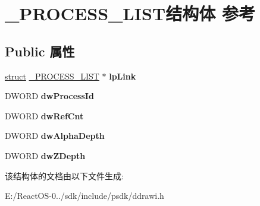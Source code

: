 \hypertarget{struct___p_r_o_c_e_s_s___l_i_s_t}{}\section{\+\_\+\+P\+R\+O\+C\+E\+S\+S\+\_\+\+L\+I\+S\+T结构体 参考}
\label{struct___p_r_o_c_e_s_s___l_i_s_t}
\subsection*{Public 属性}
\begin{DoxyCompactItemize}
\item 
\mbox{\label{struct___p_r_o_c_e_s_s___l_i_s_t_a6c4ec2fee887d7492450e69efdd9f377}} 
\hyperlink{interfacestruct}{struct} \hyperlink{struct___p_r_o_c_e_s_s___l_i_s_t}{\+\_\+\+P\+R\+O\+C\+E\+S\+S\+\_\+\+L\+I\+ST} $\ast$ {\bfseries lp\+Link}
\item 
\mbox{\label{struct___p_r_o_c_e_s_s___l_i_s_t_af2ec9f91093679a735a80cef92e9316e}} 
D\+W\+O\+RD {\bfseries dw\+Process\+Id}
\item 
\mbox{\label{struct___p_r_o_c_e_s_s___l_i_s_t_a080008bd49300be8aadc88dc947351ab}} 
D\+W\+O\+RD {\bfseries dw\+Ref\+Cnt}
\item 
\mbox{\label{struct___p_r_o_c_e_s_s___l_i_s_t_a99b6d5dc0f9b7eb00f559cdf457d47a6}} 
D\+W\+O\+RD {\bfseries dw\+Alpha\+Depth}
\item 
\mbox{\label{struct___p_r_o_c_e_s_s___l_i_s_t_a3c04aac540f68dc2fddb7816e08e3aec}} 
D\+W\+O\+RD {\bfseries dw\+Z\+Depth}
\end{DoxyCompactItemize}


该结构体的文档由以下文件生成\+:\begin{DoxyCompactItemize}
\item 
E\+:/\+React\+O\+S-\/0../sdk/include/psdk/ddrawi.\+h\end{DoxyCompactItemize}
